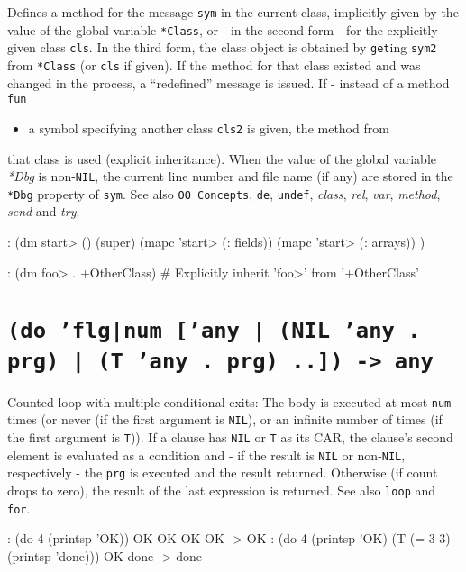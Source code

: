 Defines a method for the message \texttt{sym} in the current class,
implicitly given by the value of the global variable \texttt{*Class},
or - in the second form - for the explicitly given class \texttt{cls}.
In the third form, the class object is obtained by \texttt{get}ing
\texttt{sym2} from \texttt{*Class} (or \texttt{cls} if given). If the
method for that class existed and was changed in the process, a
``redefined'' message is issued. If - instead of a method \texttt{fun}
\begin{itemize}
\item a symbol specifying another class \texttt{cls2} is given, the method from
\end{itemize}
that class is used (explicit inheritance). When the value of the global
variable \emph{*Dbg} is non-\texttt{NIL}, the current line number
and file name (if any) are stored in the \texttt{*Dbg} property of \texttt{sym}. See
also \texttt{OO Concepts}, \texttt{de}, \texttt{undef}, \emph{class},
\emph{rel}, \emph{var},
\emph{method}, \emph{send} and
\emph{try}.


\begin{wideverbatim}
: (dm start> ()
   (super)
   (mapc 'start> (: fields))
   (mapc 'start> (: arrays)) )

: (dm foo> . +OtherClass)  # Explicitly inherit 'foo>' from '+OtherClass'
\end{wideverbatim}

 
\section*{\texttt{(do 'flg|num ['any | (NIL 'any . prg) | (T 'any . prg) ..]) -> any}}
\label{sec:func-ref-D-(do 'flg|num ['any | (NIL 'any . prg) | (T 'any . prg) ..]) -> any}


Counted loop with multiple conditional exits: The body is executed at
most \texttt{num} times (or never (if the first argument is \texttt{NIL}), or an
infinite number of times (if the first argument is \texttt{T})). If a clause
has \texttt{NIL} or \texttt{T} as its CAR, the clause's second element is evaluated as
a condition and - if the result is \texttt{NIL} or non-\texttt{NIL}, respectively -
the \texttt{prg} is executed and the result returned. Otherwise (if count drops
to zero), the result of the last expression is returned. See also \texttt{loop}
and \texttt{for}.


\begin{wideverbatim}
: (do 4 (printsp 'OK))
OK OK OK OK -> OK
: (do 4 (printsp 'OK) (T (= 3 3) (printsp 'done)))
OK done -> done
\end{wideverbatim}

